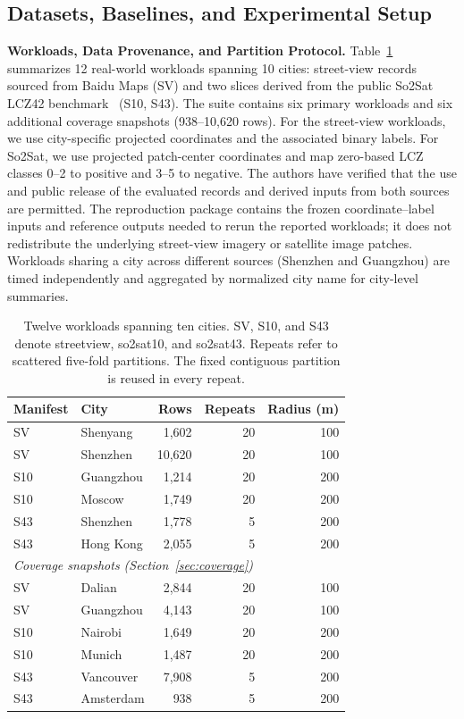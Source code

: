 \documentclass[sigconf, nonacm]{acmart}
\begin{document}
\subsection{Datasets, Baselines, and Experimental Setup}
\textbf{Workloads, Data Provenance, and Partition Protocol.} Table~\ref{tab:data} summarizes 12 real-world workloads spanning 10 cities: street-view records sourced from Baidu Maps (SV) and two slices derived from the public So2Sat LCZ42 benchmark~\cite{zhu2020} (S10, S43). The suite contains six primary workloads and six additional coverage snapshots (938--10{,}620 rows). For the street-view workloads, we use city-specific projected coordinates and the associated binary labels. For So2Sat, we use projected patch-center coordinates and map zero-based LCZ classes 0--2 to positive and 3--5 to negative. The authors have verified that the use and public release of the evaluated records and derived inputs from both sources are permitted. The reproduction package contains the frozen coordinate--label inputs and reference outputs needed to rerun the reported workloads; it does not redistribute the underlying street-view imagery or satellite image patches. Workloads sharing a city across different sources (Shenzhen and Guangzhou) are timed independently and aggregated by normalized city name for city-level summaries.

\begin{table}[t]
\caption{Twelve workloads spanning ten cities. SV, S10, and S43 denote streetview, so2sat10, and so2sat43. Repeats refer to scattered five-fold partitions. The fixed contiguous partition is reused in every repeat.}
\label{tab:data}\centering
\begin{tabular}{llrrr}\toprule
Manifest & City & Rows & Repeats & Radius (m)\\\midrule
SV & Shenyang & 1,602 & 20 & 100\\
SV & Shenzhen & 10,620 & 20 & 100\\
S10 & Guangzhou & 1,214 & 20 & 200\\
S10 & Moscow & 1,749 & 20 & 200\\
S43 & Shenzhen & 1,778 & 5 & 200\\
S43 & Hong Kong & 2,055 & 5 & 200\\\midrule
\multicolumn{5}{l}{\emph{Coverage snapshots (Section~\ref{sec:coverage})}}\\
SV & Dalian & 2,844 & 20 & 100\\
SV & Guangzhou & 4,143 & 20 & 100\\
S10 & Nairobi & 1,649 & 20 & 200\\
S10 & Munich & 1,487 & 20 & 200\\
S43 & Vancouver & 7,908 & 5 & 200\\
S43 & Amsterdam & 938 & 5 & 200\\\bottomrule
\end{tabular}
\end{table}
\end{document}
